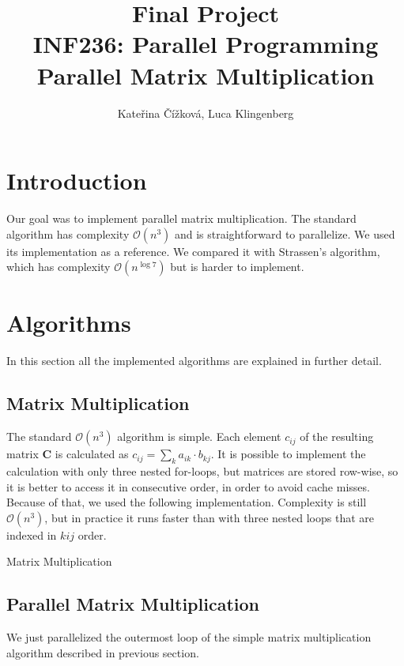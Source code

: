 \documentclass{article}
\title{Final Project\\ INF236: Parallel Programming\\ Parallel Matrix Multiplication}
\author{Kate\v{r}ina \v{C}\'{i}\v{z}kov\'{a}, Luca Klingenberg}
\begin{document}
\maketitle

\section{Introduction}
Our goal was to implement parallel matrix multiplication.
The standard algorithm has complexity $\mathcal{O}(n^3)$ and is straightforward
to parallelize. We used its implementation as a reference. We compared
it with Strassen's algorithm, which has complexity $\mathcal{O}(n^{\log{}7})$
but is harder to implement.

\section{Algorithms}
In this section all the implemented algorithms are explained in further detail.

\subsection{Matrix Multiplication}
The standard $\mathcal{O}(n^3)$ algorithm is simple. Each element $c_{ij}$ of 
the resulting matrix $\mathbf{C}$ is calculated as $c_{ij} =\sum_k a_{ik} \cdot b_{kj}$.
It is possible to implement the calculation with only three nested for-loops, but 
matrices are stored row-wise, so it is better to access it in consecutive order, in order to avoid cache misses.
Because of that, we used the following implementation. Complexity is still $\mathcal{O}(n^3)$,
but in practice it runs faster than with three nested loops that are indexed in $kij$ order.

\begin{algorithm}[H] 
\caption{Matrix Multiplication}
\label{alg:matmul}
\begin{algorithmic}[1]
\Statex
{}
		\EndFor
			\EndFor
		\EndFor
	\EndFor
	\State {}
\EndFunction
\end{algorithmic}
\end{algorithm}

\subsection{Parallel Matrix Multiplication}
We just parallelized the outermost loop of the simple matrix multiplication algorithm
described in previous section.
\end{document}
